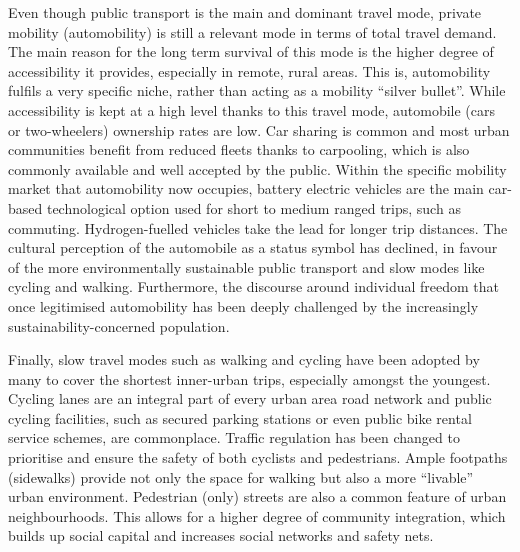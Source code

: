 {Even though public transport is the main and dominant travel mode, private mobility (automobility) is still a relevant mode in terms of total travel demand. The main reason for the long term survival of this mode is the higher degree of accessibility it provides, especially in remote, rural areas. This is, automobility fulfils a very specific niche, rather than acting as a mobility ``silver bullet''. While accessibility is kept at a high level thanks to this travel mode, automobile (cars or two-wheelers) ownership rates are low. Car sharing is common and most urban communities benefit from reduced fleets thanks to carpooling, which is also commonly available and well accepted by the public. Within the specific mobility market that automobility now occupies, battery electric vehicles are the main car-based technological option used for short to medium ranged trips, such as commuting. Hydrogen-fuelled vehicles take the lead for longer trip distances. The cultural perception of the automobile as a status symbol has declined, in favour of the more environmentally sustainable public transport and slow modes like cycling and walking. Furthermore, the discourse around individual freedom that once legitimised automobility has been deeply challenged by the increasingly sustainability-concerned population.

Finally, slow travel modes such as walking and cycling have been adopted by many to cover the shortest inner-urban trips, especially amongst the youngest. Cycling lanes are an integral part of every urban area road network and public cycling facilities, such as secured parking stations or even public bike rental service schemes, are commonplace. Traffic regulation has been changed to prioritise and ensure the safety of both cyclists and pedestrians. Ample footpaths (sidewalks) provide not only the space for walking but also a more ``livable'' urban environment. Pedestrian (only) streets are also a common feature of urban neighbourhoods. This allows for a higher degree of community integration, which builds up social capital and increases social networks and safety nets.
}
%

